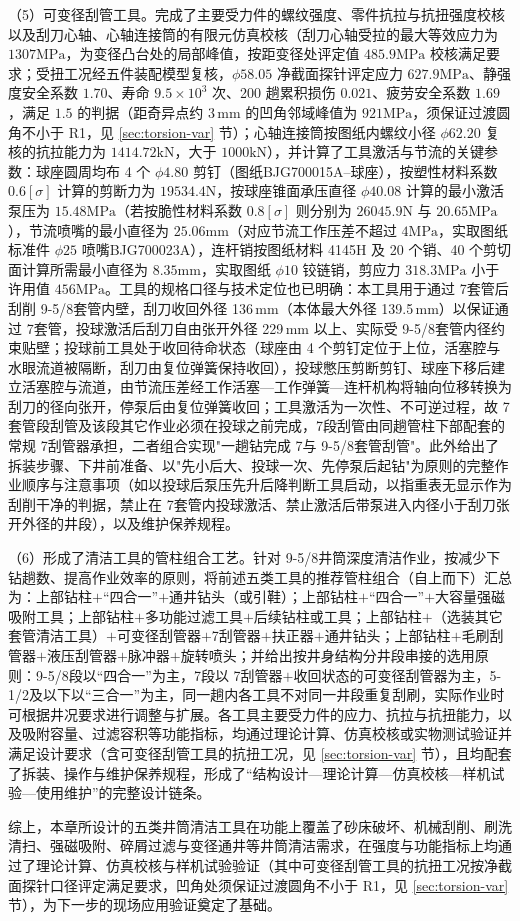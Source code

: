 （5）可变径刮管工具。完成了主要受力件的螺纹强度、零件抗拉与抗扭强度校核以及刮刀心轴、心轴连接筒的有限元仿真校核（刮刀心轴受拉的最大等效应力为 $1307\mathrm{MPa}$，为变径凸台处的局部峰值，按距变径处评定值 $485.9\mathrm{MPa}$ 校核满足要求；受扭工况经五件装配模型复核，$\phi 58.05$ 净截面探针评定应力 $627.9\mathrm{MPa}$、静强度安全系数 $1.70$、寿命 $9.5\times10^{3}$ 次、200 趟累积损伤 $0.021$、疲劳安全系数 $1.69$，满足 $1.5$ 的判据（距奇异点约 3\,mm 的凹角邻域峰值为 $921\mathrm{MPa}$，须保证过渡圆角不小于 R1，见 \ref{sec:torsion-var} 节）；心轴连接筒按图纸内螺纹小径 $\phi 62.20$ 复核的抗拉能力为 $1414.72\mathrm{kN}$，大于 $1000\mathrm{kN}$），并计算了工具激活与节流的关键参数：球座圆周均布 4 个 $\phi 4.80$ 剪钉（图纸BJG700015A--球座），按塑性材料系数 $0.6[\sigma]$ 计算的剪断力为 $19534.4\mathrm{N}$，按球座锥面承压直径 $\phi 40.08$ 计算的最小激活泵压为 $15.48\mathrm{MPa}$（若按脆性材料系数 $0.8[\sigma]$ 则分别为 $26045.9\mathrm{N}$ 与 $20.65\mathrm{MPa}$），节流喷嘴的最小直径为 $25.06\mathrm{mm}$（对应节流工作压差不超过 $4\mathrm{MPa}$，实取图纸标准件 $\phi 25$ 喷嘴BJG700023A），连杆销按图纸材料 4145H 及 20 个销、40 个剪切面计算所需最小直径为 $8.35\mathrm{mm}$，实取图纸 $\phi 10$ 铰链销，剪应力 $318.3\mathrm{MPa}$ 小于许用值 $456\mathrm{MPa}$。工具的规格口径与技术定位也已明确：本工具用于通过 7\inch 套管后刮削 9-5/8\inch 套管内壁，刮刀收回外径 136\,mm（本体最大外径 139.5\,mm）以保证通过 7\inch 套管，投球激活后刮刀自由张开外径 229\,mm 以上、实际受 9-5/8\inch 套管内径约束贴壁；投球前工具处于收回待命状态（球座由 4 个剪钉定位于上位，活塞腔与水眼流道被隔断，刮刀由复位弹簧保持收回），投球憋压剪断剪钉、球座下移后建立活塞腔与流道，由节流压差经工作活塞—工作弹簧—连杆机构将轴向位移转换为刮刀的径向张开，停泵后由复位弹簧收回；工具激活为一次性、不可逆过程，故 7\inch 套管段刮管及该段其它作业必须在投球之前完成，7\inch 段刮管由同趟管柱下部配套的常规 7\inch 刮管器承担，二者组合实现"一趟钻完成 7\inch 与 9-5/8\inch 套管刮管"。此外给出了拆装步骤、下井前准备、以"先小后大、投球一次、先停泵后起钻"为原则的完整作业顺序与注意事项（如以投球后泵压先升后降判断工具启动，以指重表无显示作为刮削干净的判据，禁止在 7\inch 套管内投球激活、禁止激活后带泵进入内径小于刮刀张开外径的井段），以及维护保养规程。

（6）形成了清洁工具的管柱组合工艺。针对 9-5/8\inch 井筒深度清洁作业，按减少下钻趟数、提高作业效率的原则，将前述五类工具的推荐管柱组合（自上而下）汇总为：上部钻柱$+$“四合一”$+$通井钻头（或引鞋）；上部钻柱$+$“四合一”$+$大容量强磁吸附工具；上部钻柱$+$多功能过滤工具$+$后续钻柱或工具；上部钻柱$+$（选装其它套管清洁工具）$+$可变径刮管器$+$7\inch 刮管器$+$扶正器$+$通井钻头；上部钻柱$+$毛刷刮管器$+$液压刮管器$+$脉冲器$+$旋转喷头；并给出按井身结构分井段串接的选用原则：9-5/8\inch 段以“四合一”为主，7\inch 段以 7\inch 刮管器$+$收回状态的可变径刮管器为主，5-1/2\inch 及以下以“三合一”为主，同一趟内各工具不对同一井段重复刮刷，实际作业时可根据井况要求进行调整与扩展。各工具主要受力件的应力、抗拉与抗扭能力，以及吸附容量、过滤容积等功能指标，均通过理论计算、仿真校核或实物测试验证并满足设计要求（含可变径刮管工具的抗扭工况，见 \ref{sec:torsion-var} 节），且均配套了拆装、操作与维护保养规程，形成了“结构设计—理论计算—仿真校核—样机试验—使用维护”的完整设计链条。

综上，本章所设计的五类井筒清洁工具在功能上覆盖了砂床破坏、机械刮削、刷洗清扫、强磁吸附、碎屑过滤与变径通井等井筒清洁需求，在强度与功能指标上均通过了理论计算、仿真校核与样机试验验证（其中可变径刮管工具的抗扭工况按净截面探针口径评定满足要求，凹角处须保证过渡圆角不小于 R1，见 \ref{sec:torsion-var} 节），为下一步的现场应用验证奠定了基础。
